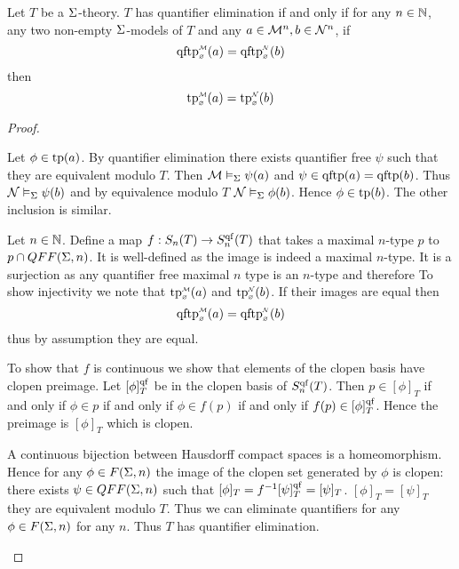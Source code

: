 \begin{prop}
    Let $T$ be a $\Sigma$-theory.
    $T$ has quantifier elimination if and only if for any $n \in \mathbb{N}$,
    any two non-empty $\Sigma$-models of $T$ and any $a \in \mathcal{M}^n, b \in \mathcal{N}^n$,
    if \[\subintp{\nothing}{\MM}{\qftp}(a) = 
    \subintp{\nothing}{\NN}{\qftp}(b)\]
    then \[\subintp{\nothing}{\MM}{\tp}(a) = 
    \subintp{\nothing}{\NN}{\tp}(b)\]
\end{prop}
\begin{proof}
    \begin{forward}
        Let $\phi \in {\operatorname{tp}}(a)$.
        By quantifier elimination there exists quantifier free $\psi$
        such that they are equivalent modulo $T$.
        Then $\mathcal{M} \vDash_{\Sigma} \psi(a)$ and 
        $\psi \in {\operatorname{qftp}}(a) = {\operatorname{qftp}}(b)$.
        Thus $\mathcal{N} \vDash_{\Sigma} \psi(b)$ and by equivalence modulo $T$
        $\mathcal{N} \vDash_{\Sigma} \phi(b)$.
        Hence $\phi \in {\operatorname{tp}}(b)$.
        The other inclusion is similar.
    \end{forward}

    \begin{backward}
        Let $n \in \mathbb{N}$. Define a map $f : S_n(T) \to S_n^{\operatorname{qf}}(T)$ 
        that takes a maximal $n$-type $p$ to $p \cap QFF(\Sigma,n)$.
        It is well-defined as the image is indeed a maximal $n$-type.
        It is a surjection as any quantifier free maximal 
        $n$ type is an $n$-type 
        and therefore 
        To show injectivity we note that
        $\subintp{\nothing}{\MM}{\tp}(a)$ and  
        $\subintp{\nothing}{\NN}{\tp}(b)$.
        If their images are equal then 
        \[\subintp{\nothing}{\MM}{\qftp}(a) = 
        \subintp{\nothing}{\NN}{\qftp}(b)\]
        thus by assumption they are equal.

        To show that $f$ is continuous we show that elements of 
        the clopen basis have clopen preimage.
        Let $[\phi]_T^{\operatorname{qf}}$ be in the clopen basis of $S_n^{\operatorname{qf}}(T)$.
        Then $p \in [\phi]_T$ if and only if $\phi \in p$ if and only if 
        $\phi \in f(p)$ if and only if $f(p) \in [\phi]_T^{\operatorname{qf}}$.
        Hence the preimage is $[\phi]_T$ which is clopen.

        A continuous bijection between Hausdorff compact spaces is a 
        homeomorphism. 
        Hence for any $\phi \in F(\Sigma,n)$ the image of the clopen set generated
        by $\phi$ is clopen: there exists $\psi \in QFF(\Sigma,n)$
        such that $[\phi]_T = f^{-1}[\psi]_T^{\operatorname{qf}} = [\psi]_T$.
        $[\phi]_T = [\psi]_T$  
        they are equivalent modulo $T$.
        Thus we can eliminate quantifiers for any 
        $\phi \in F(\Sigma,n)$ for any $n$.
        Thus $T$ has quantifier elimination.
    \end{backward}
\end{proof}

